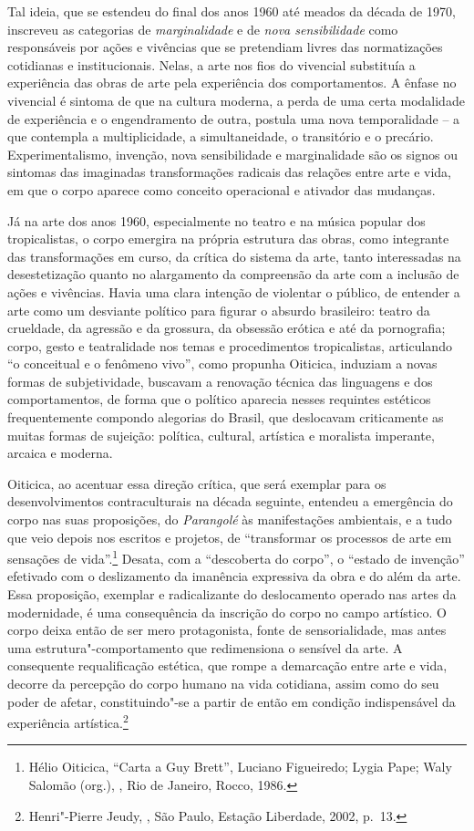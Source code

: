 Tal ideia, que se estendeu do final dos anos 1960 até meados da década
de 1970, inscreveu as categorias de \emph{marginalidade} e de \emph{nova
sensibilidade} como responsáveis por ações e vivências que se pretendiam
livres das normatizações cotidianas e institucionais. Nelas, a arte nos
fios do vivencial substituía a experiência das obras de arte pela
experiência dos comportamentos. A ênfase no vivencial é sintoma de que
na cultura moderna, a perda de uma certa modalidade de experiência e o
engendramento de outra, postula uma nova temporalidade -- a que
contempla a multiplicidade, a simultaneidade, o transitório e o
precário. Experimentalismo, invenção, nova sensibilidade e marginalidade
são os signos ou sintomas das imaginadas transformações radicais das
relações entre arte e vida, em que o corpo aparece como conceito
operacional e ativador das mudanças.

Já na arte dos anos 1960, especialmente no teatro e na música popular
dos tropicalistas, o corpo emergira na própria estrutura das obras, como
integrante das transformações em curso, da crítica do sistema da arte,
tanto interessadas na desestetização quanto no alargamento da
compreensão da arte com a inclusão de ações e vivências. Havia uma clara
intenção de violentar o público, de entender a arte como um desviante
político para figurar o absurdo brasileiro: teatro da crueldade, da
agressão e da grossura, da obsessão erótica e até da pornografia; corpo,
gesto e teatralidade nos temas e procedimentos tropicalistas,
articulando ``o conceitual e o fenômeno vivo'', como propunha Oiticica,
induziam a novas formas de subjetividade, buscavam a renovação técnica
das linguagens e dos comportamentos, de forma que o político aparecia
nesses requintes estéticos frequentemente compondo alegorias do Brasil,
que deslocavam criticamente as muitas formas de sujeição: política,
cultural, artística e moralista imperante, arcaica e moderna.

Oiticica, ao acentuar essa direção crítica, que será exemplar para os
desenvolvimentos contraculturais na década seguinte, entendeu a
emergência do corpo nas suas proposições, do \emph{Parangolé} às
manifestações ambientais, e a tudo que veio depois nos escritos e
projetos, de ``transformar os processos de arte em sensações de
vida''.\footnote{Hélio Oiticica, ``Carta a Guy Brett'', Luciano
Figueiredo; Lygia Pape; Waly Salomão (org.), {}, Rio de Janeiro, Rocco, 1986.} Desata, com a ``descoberta
do corpo'', o ``estado de invenção'' efetivado com o deslizamento da
imanência expressiva da obra e do além da arte. Essa proposição,
exemplar e radicalizante do deslocamento operado nas artes da
modernidade, é uma consequência da inscrição do corpo no campo
artístico. O corpo deixa então de ser mero protagonista, fonte de
sensorialidade, mas antes uma estrutura"-comportamento que redimensiona o
sensível da arte. A consequente requalificação estética, que rompe a
demarcação entre arte e vida, decorre da percepção do corpo humano na
vida cotidiana, assim como do seu poder de afetar, constituindo"-se a
partir de então em condição indispensável da experiência
artística.\footnote{Henri"-Pierre Jeudy, {}, São Paulo,
Estação Liberdade, 2002, p.~13.}


